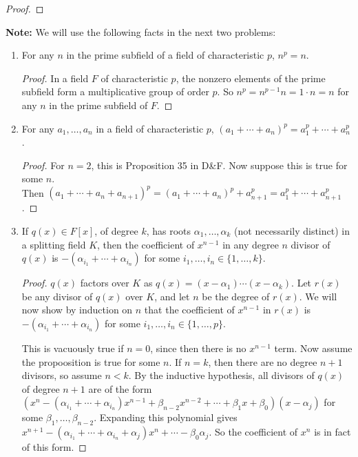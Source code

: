 \documentclass[10pt]{article}
\begin{document}
\begin{enumerate}
\begin{proof}
\end{proof}

\noindent \textbf{Note:} We will use the following facts in the next two problems:
\begin{enumerate}
\item For any $n$ in the prime subfield of a field of characteristic $p$, $n^p = n$.

\begin{proof}
In a field $F$ of characteristic $p$, the nonzero elements of the prime subfield form a multiplicative group of order $p$.  So $n^p = n^{p-1}n = 1 \cdot n = n$ for any $n$ in the prime subfield of $F$.
\end{proof}

\item For any $a_1, \dots , a_n$ in a field of characteristic $p$, $(a_1 + \cdots + a_n)^p = a_1^p + \cdots + a_n^p$.

\begin{proof}
For $n = 2$, this is Proposition 35 in D\&F.  Now suppose this is true for some $n$.\\ Then $(a_1 + \cdots + a_n + a_{n+1})^p = (a_1 + \cdots + a_n)^p + a_{n+1}^p = a_1^p + \cdots + a_{n+1}^p$.
\end{proof}

\item If $q(x) \in F[x]$, of degree $k$, has roots $\alpha_1, \dots , \alpha_k$ (not necessarily distinct) in a splitting field $K$, then the coefficient of $x^{n-1}$ in any degree $n$ divisor of $q(x)$ is $-(\alpha_{i_1} + \cdots + \alpha_{i_n})$ for some $i_1, \dots , i_n \in \{1, \dots , k \}$.

\begin{proof}
$q(x)$ factors over $K$ as $q(x) = (x-\alpha_1) \cdots (x-\alpha_k)$.  Let $r(x)$ be any divisor of $q(x)$ over $K$, and let $n$ be the degree of $r(x)$.  We will now show by induction on $n$ that the coefficient of $x^{n-1}$ in $r(x)$ is $-(\alpha_{i_1} + \cdots + \alpha_{i_n})$ for some $i_1, \dots , i_n \in \{1, \dots , p \}$.

This is vacuously true if $n = 0$, since then there is no $x^{n-1}$ term.  Now assume the propoosition is true for some $n$.  If $n = k$, then there are no degree $n+1$ divisors, so assume $n < k$.  By the inductive hypothesis, all divisors of $q(x)$ of degree $n+1$ are of the form $(x^n - (\alpha_{i_1} + \cdots + \alpha_{i_n})x^{n-1} + \beta_{n-2} x^{n-2} + \cdots + \beta_1 x + \beta_0) (x - \alpha_j)$ for some $\beta_1, \dots , \beta_{n-2}$.  Expanding this polynomial gives $x^{n+1} - (\alpha_{i_1} + \cdots + \alpha_{i_n} + \alpha_j )x^n + \cdots - \beta_0 \alpha_j.$  So the coefficient of $x^n$ is in fact of this form.
\end{proof}


\end{enumerate}
\end{enumerate}
\end{document}
